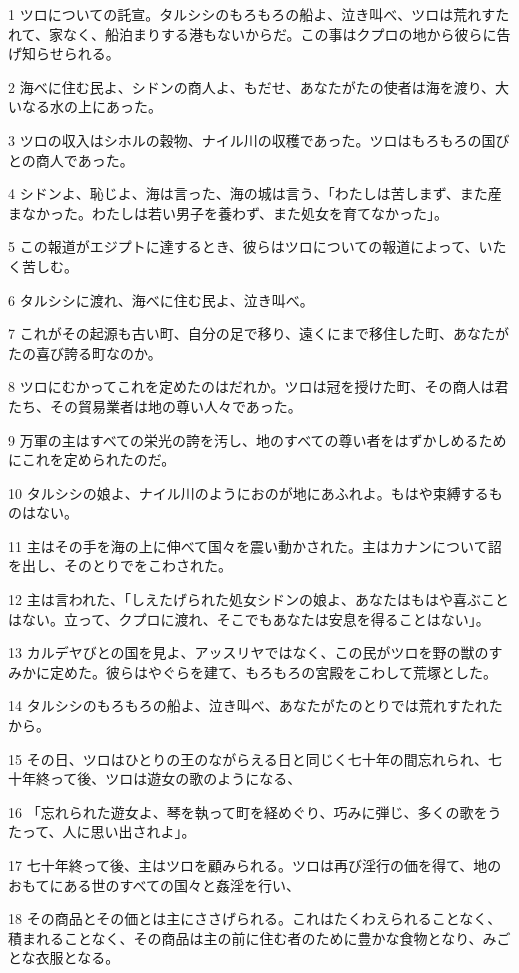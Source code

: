 \par 1 ツロについての託宣。タルシシのもろもろの船よ、泣き叫べ、ツロは荒れすたれて、家なく、船泊まりする港もないからだ。この事はクプロの地から彼らに告げ知らせられる。
\par 2 海べに住む民よ、シドンの商人よ、もだせ、あなたがたの使者は海を渡り、大いなる水の上にあった。
\par 3 ツロの収入はシホルの穀物、ナイル川の収穫であった。ツロはもろもろの国びとの商人であった。
\par 4 シドンよ、恥じよ、海は言った、海の城は言う、「わたしは苦しまず、また産まなかった。わたしは若い男子を養わず、また処女を育てなかった」。
\par 5 この報道がエジプトに達するとき、彼らはツロについての報道によって、いたく苦しむ。
\par 6 タルシシに渡れ、海べに住む民よ、泣き叫べ。
\par 7 これがその起源も古い町、自分の足で移り、遠くにまで移住した町、あなたがたの喜び誇る町なのか。
\par 8 ツロにむかってこれを定めたのはだれか。ツロは冠を授けた町、その商人は君たち、その貿易業者は地の尊い人々であった。
\par 9 万軍の主はすべての栄光の誇を汚し、地のすべての尊い者をはずかしめるためにこれを定められたのだ。
\par 10 タルシシの娘よ、ナイル川のようにおのが地にあふれよ。もはや束縛するものはない。
\par 11 主はその手を海の上に伸べて国々を震い動かされた。主はカナンについて詔を出し、そのとりでをこわされた。
\par 12 主は言われた、「しえたげられた処女シドンの娘よ、あなたはもはや喜ぶことはない。立って、クプロに渡れ、そこでもあなたは安息を得ることはない」。
\par 13 カルデヤびとの国を見よ、アッスリヤではなく、この民がツロを野の獣のすみかに定めた。彼らはやぐらを建て、もろもろの宮殿をこわして荒塚とした。
\par 14 タルシシのもろもろの船よ、泣き叫べ、あなたがたのとりでは荒れすたれたから。
\par 15 その日、ツロはひとりの王のながらえる日と同じく七十年の間忘れられ、七十年終って後、ツロは遊女の歌のようになる、
\par 16 「忘れられた遊女よ、琴を執って町を経めぐり、巧みに弾じ、多くの歌をうたって、人に思い出されよ」。
\par 17 七十年終って後、主はツロを顧みられる。ツロは再び淫行の価を得て、地のおもてにある世のすべての国々と姦淫を行い、
\par 18 その商品とその価とは主にささげられる。これはたくわえられることなく、積まれることなく、その商品は主の前に住む者のために豊かな食物となり、みごとな衣服となる。

